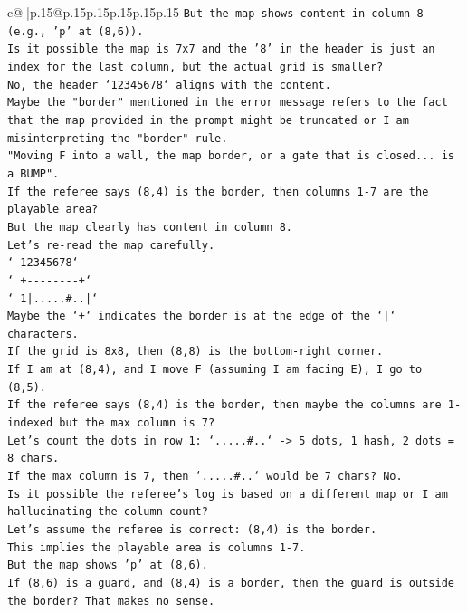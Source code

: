 \documentclass{article}
\begin{document}
{\begin{supertabular}{c@{$\;$}|p{.15\linewidth}@{}p{.15\linewidth}p{.15\linewidth}p{.15\linewidth}p{.15\linewidth}p{.15\linewidth}}
{{{\texttt{But the map shows content in column 8 (e.g., 'p' at (8,6)).} \\
\texttt{Is it possible the map is 7x7 and the '8' in the header is just an index for the last column, but the actual grid is smaller?} \\
\texttt{No, the header `12345678` aligns with the content.} \\
\texttt{Maybe the "border" mentioned in the error message refers to the fact that the map provided in the prompt might be truncated or I am misinterpreting the "border" rule.} \\
\texttt{"Moving F into a wall, the map border, or a gate that is closed... is a BUMP".} \\
\texttt{If the referee says (8,4) is the border, then columns 1{-}7 are the playable area?} \\
\texttt{But the map clearly has content in column 8.} \\
\texttt{Let's re{-}read the map carefully.} \\
\texttt{` 12345678`} \\
\texttt{`  +{-}{-}{-}{-}{-}{-}{-}{-}+`} \\
\texttt{` 1|.....\#..|`} \\
\texttt{Maybe the `+` indicates the border is at the edge of the `|` characters.} \\
\texttt{If the grid is 8x8, then (8,8) is the bottom{-}right corner.} \\
\texttt{If I am at (8,4), and I move F (assuming I am facing E), I go to (8,5).} \\
\texttt{If the referee says (8,4) is the border, then maybe the columns are 1{-}indexed but the max column is 7?} \\
\texttt{Let's count the dots in row 1: `.....\#..` {-}> 5 dots, 1 hash, 2 dots = 8 chars.} \\
\texttt{If the max column is 7, then `.....\#..` would be 7 chars? No.} \\
\texttt{Is it possible the referee's log is based on a different map or I am hallucinating the column count?} \\
\texttt{Let's assume the referee is correct: (8,4) is the border.} \\
\texttt{This implies the playable area is columns 1{-}7.} \\
\texttt{But the map shows 'p' at (8,6).} \\
\texttt{If (8,6) is a guard, and (8,4) is a border, then the guard is outside the border? That makes no sense.} \\
}}}
\end{supertabular}}
\end{document}
